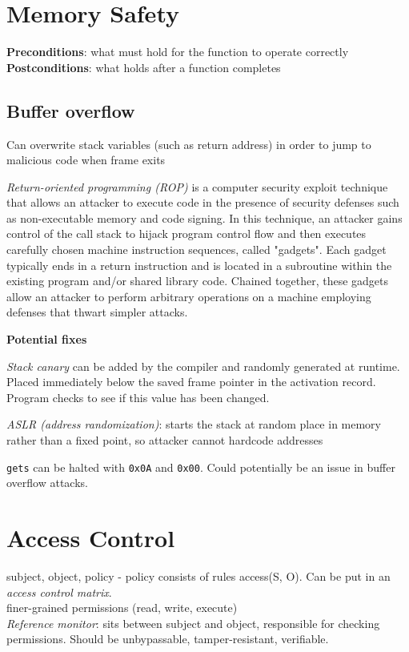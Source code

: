 \documentclass[10pt,landscape]{article}
\begin{document}
\begin{multicols}{3}
\section{Memory Safety}

\textbf{Preconditions}: what must hold for the function to operate correctly \\
\textbf{Postconditions}: what holds after a function completes \\

\subsection{Buffer overflow}

Can overwrite stack variables (such as return address) in order to jump to malicious code when frame exits

\textit{Return-oriented programming (ROP)} is a computer security exploit technique that allows an attacker to execute code in the presence of security defenses such as non-executable memory and code signing. In this technique, an attacker gains control of the call stack to hijack program control flow and then executes carefully chosen machine instruction sequences, called "gadgets". Each gadget typically ends in a return instruction and is located in a subroutine within the existing program and/or shared library code. Chained together, these gadgets allow an attacker to perform arbitrary operations on a machine employing defenses that thwart simpler attacks.

\textbf{Potential fixes}

\textit{Stack canary} can be added by the compiler and randomly generated at runtime. Placed immediately below the saved frame pointer in the activation record. Program checks to see if this value has been changed.

\textit{ASLR (address randomization)}: starts the stack at random place in memory rather than a fixed point, so attacker cannot hardcode addresses

\texttt{gets} can be halted with \texttt{0x0A} and \texttt{0x00}. Could potentially be an issue in buffer overflow attacks.


\section{Access Control}

subject, object, policy - policy consists of rules access(S, O). Can be put in an \textit{access control matrix}. \\
finer-grained permissions (read, write, execute) \\
\textit{Reference monitor}: sits between subject and object, responsible for checking permissions. Should be unbypassable, tamper-resistant, verifiable.


\end{multicols}
\end{document}
